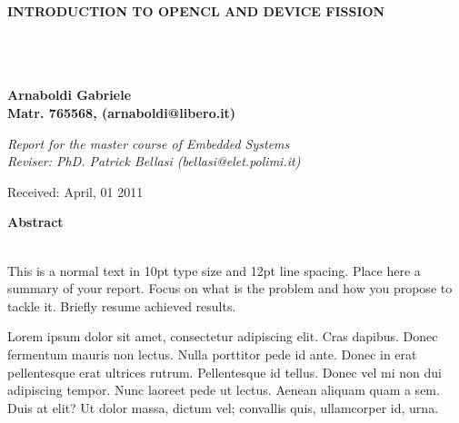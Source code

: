\documentclass[a4paper,10pt]{article}
\newenvironment*{mytitle}{\begin{LARGE}\bf}{\end{LARGE}\\}%
\newenvironment*{mysubtitle}{\bf}{\\[1.5ex]}%
\newenvironment*{myabstract}{\begin{Large}\bf}{\end{Large}\\[2.5ex]}%
\begin{document}
\nocite{*}
\begin{mytitle}INTRODUCTION TO OPENCL AND DEVICE FISSION\end{mytitle}
\begin{mysubtitle}\end{mysubtitle}
%
%
\\
Arnaboldi Gabriele\\
Matr. 765568, (arnaboldi@libero.it)\\
\hspace{10ex}
\begin{flushright}
\emph{Report for the master course of Embedded Systems}\\
\emph{Reviser: PhD. Patrick Bellasi (bellasi@elet.polimi.it)}
\end{flushright}

Received: April, 01 2011\\
\hspace{10ex}

\begin{myabstract} Abstract \end{myabstract}
This is a normal text in 10pt type size and 12pt line spacing.
Place here a summary of your report. Focus on what is the problem and how you
propose to tackle it. Briefly resume achieved results.

Lorem ipsum dolor sit amet, consectetur adipiscing elit. Cras dapibus. Donec
fermentum mauris non lectus. Nulla porttitor pede id ante. Donec in erat
pellentesque erat ultrices rutrum. Pellentesque id tellus. Donec vel mi non dui
adipiscing tempor.  Nunc laoreet pede ut lectus. Aenean aliquam quam a sem. Duis
at elit? Ut dolor massa, dictum vel; convallis quis, ullamcorper id, urna.

\vspace{4ex}	%
\begin{multicols}{2}





\end{multicols}

\begin{multicols}{2}





\end{multicols}
\end{document}
